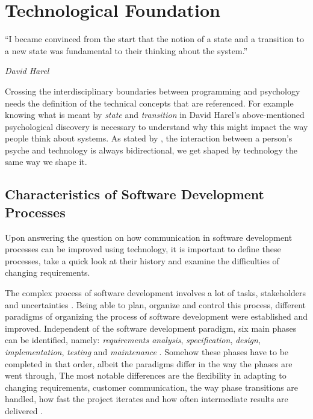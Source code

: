 \chapter{Technological Foundation}
\label{chap:technological-foundation}
\epigraph{``I became convinced from the start that the notion of a state and a transition to a new state was fundamental to their thinking about the system.''}{\textit{David Harel}}
\noindent
Crossing the interdisciplinary boundaries between programming and psychology needs the definition of the technical concepts that are referenced.
For example knowing what is meant by \emph{state} and \emph{transition} in David Harel's above-mentioned psychological discovery is necessary to understand why this might impact the way people think about systems. 
As stated by \textcite{schraube_ich_2012}, the interaction between a person's psyche and technology is always bidirectional, we get shaped by technology the same way we shape it.

\section{Characteristics of Software Development Processes}
\label{sec:characteristics-of-software-development-processes}
Upon answering the question on how communication in software development processes can be improved using technology, it is important to define these processes, take a quick look at their history and examine the difficulties of changing requirements.

The complex process of software development involves a lot of tasks, stakeholders and uncertainties \autocite{mayr_projekt_2005}.
Being able to plan, organize and control this process, different paradigms of organizing the process of software development were established and improved.
Independent of the software development paradigm, six main phases can be identified, namely: \emph{requirements analysis}, \emph{specification}, \emph{design}, \emph{implementation}, \emph{testing} and \emph{maintenance} \autocite{harel_statecharts:_1987}.
Somehow these phases have to be completed in that order, albeit the paradigms differ in the way the phases are went through, 
The most notable differences are the flexibility in adapting to changing requirements, customer communication, the way phase transitions are handled, how fast the project iterates and how often intermediate results are delivered \autocite{mayr_projekt_2005}.


